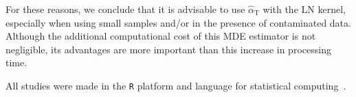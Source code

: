 \documentclass[twocolumn]{svjour3}
\begin{document}
For these reasons, we conclude that it is advisable to use $\widehat{\alpha}_{\text{T}}$ with the LN kernel, especially when using small samples and/or in the presence of contaminated data. 
Although the additional computational cost of this MDE estimator is not negligible, its advantages are more important than this increase in processing time.

All studies were made in the \texttt R platform and language for statistical computing~\cite{RLanguage}.




%    
%    
\end{document}
